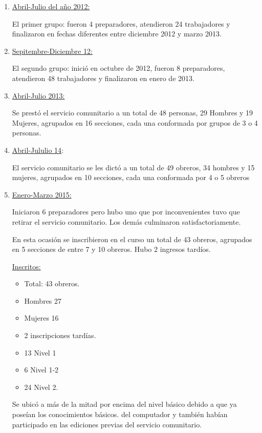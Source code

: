             \begin{enumerate}
                \item \underline{Abril-Julio del año 2012:} 
                
                El primer grupo: fueron 4 preparadores, atendieron 24 trabajadores y finalizaron en fechas diferentes entre diciembre 2012 y marzo 2013.
                
                \item \underline{Sepitembre-Diciembre 12:}
                
                El segundo grupo: inició en octubre de 2012, fueron 8 preparadores, atendieron 48 trabajadores y finalizaron en enero de 2013.
                
                \item \underline{Abril-Julio 2013:}
                
                Se prestó el servicio comunitario a un total de 48 personas, 29  Hombres y 19 Mujeres,  agrupados en 16 secciones, cada una conformada por grupos de 3 o 4 personas.
               
                \item \underline{Abril-Jululio 14}:
                
                El servicio comunitario se les dictó a un total de 49 obreros, 34 hombres y 15 mujeres, agrupados en 10 secciones, cada una conformada por 4 o 5 obreros
                
                \item \underline{Enero-Marzo 2015:}
                
                Iniciaron 6 preparadores pero hubo uno que por inconvenientes tuvo que retirar el servicio comunitario. Los demás culminaron satisfactoriamente.
                
                En esta ocasión se inscribieron en el curso un total de 43 obreros, agrupados en 5 secciones de entre 7 y 10 obreros. Hubo 2 ingresos tardíos.
                
                \underline{Inscritos:}
                \begin{itemize}
                    \item Total: 43 obreros.
                    \item Hombres 27
                    \item Mujeres 16
                    \item 2 inscripciones tardías.
                    \item 13 Nivel 1
                    \item 6 Nivel 1-2
                    \item 24 Nivel 2.
                \end{itemize}
                
                Se ubicó a más de la mitad por encima del nivel básico debido a que ya poseían los conocimientos básicos. del computador y también habían participado en las ediciones previas del servicio comunitario.
                
                
            \end{enumerate}
            
	\pagebreak